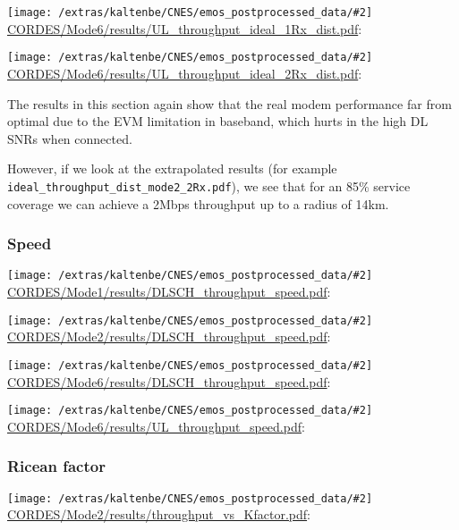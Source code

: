 \documentclass[a4paper,10pt]{article}
\newcommand{\printfile}[2][]{
 \begin{minipage}{8cm}
  \centering
  \texttt{[image: /extras/kaltenbe/CNES/emos\_postprocessed\_data/\#2]}
  \url{#2}: #1

 \end{minipage}
}
\begin{document}
\printfile{CORDES/Mode6/results/UL_throughput_ideal_1Rx_dist.pdf}
\printfile{CORDES/Mode6/results/UL_throughput_ideal_2Rx_dist.pdf}

The results in this section again show that the real modem performance far from optimal due to the EVM limitation in baseband, which hurts in the high DL SNRs when connected.

However, if we look at the extrapolated results (for example \verb+ideal_throughput_dist_mode2_2Rx.pdf+), we see that for an 85\% service coverage we can achieve a 2Mbps throughput up to a radius of 14km. 

\subsubsection{Speed}

\printfile{CORDES/Mode1/results/DLSCH_throughput_speed.pdf}
\printfile{CORDES/Mode2/results/DLSCH_throughput_speed.pdf}

\printfile{CORDES/Mode6/results/DLSCH_throughput_speed.pdf}
\printfile{CORDES/Mode6/results/UL_throughput_speed.pdf}


\subsubsection{Ricean factor}

\printfile{CORDES/Mode2/results/throughput_vs_Kfactor.pdf}
\end{document}
